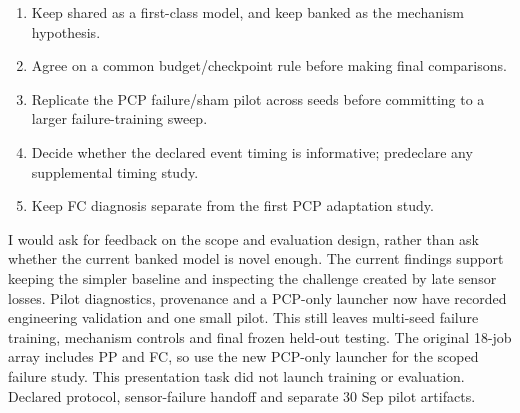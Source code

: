{\begin{enumerate}
\item Keep shared as a first-class model, and keep banked as the mechanism hypothesis.
\item Agree on a common budget/checkpoint rule before making final comparisons.
\item Replicate the PCP failure/sham pilot across seeds before committing to a larger failure-training sweep.
\item Decide whether the declared event timing is informative; predeclare any supplemental timing study.
\item Keep FC diagnosis separate from the first PCP adaptation study.
\end{enumerate}
}
{I would ask for feedback on the scope and evaluation design, rather than ask whether the current banked model is novel enough. The current findings support keeping the simpler baseline and inspecting the challenge created by late sensor losses. Pilot diagnostics, provenance and a PCP-only launcher now have recorded engineering validation and one small pilot. This still leaves multi-seed failure training, mechanism controls and final frozen held-out testing. The original 18-job array includes PP and FC, so use the new PCP-only launcher for the scoped failure study. This presentation task did not launch training or evaluation.}
{Declared protocol, sensor-failure handoff and separate 30 Sep pilot artifacts.}

